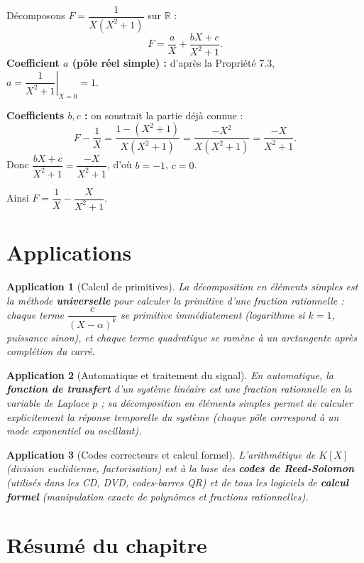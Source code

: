 \documentclass[a4paper,12pt,openany]{book}
\newtheorem{application}{Application}[section]
\begin{document}
\begin{exemple}[7.8]
Décomposons $F=\dfrac{1}{X(X^2+1)}$ sur $\mathbb{R}$ :
\[
F = \frac{a}{X} + \frac{bX+c}{X^2+1}.
\]
\textbf{Coefficient $a$ (pôle réel simple) :} d'après la Propriété 7.3,
$a = \left.\dfrac{1}{X^2+1}\right|_{X=0} = 1$.

\textbf{Coefficients $b,c$ :} on soustrait la partie déjà connue :
\[
F - \frac{1}{X} = \frac{1-(X^2+1)}{X(X^2+1)} = \frac{-X^2}{X(X^2+1)} =
\frac{-X}{X^2+1}.
\]
Donc $\dfrac{bX+c}{X^2+1} = \dfrac{-X}{X^2+1}$, d'où $b=-1$, $c=0$.

Ainsi $F = \dfrac1X - \dfrac{X}{X^2+1}$.
\end{exemple}

\section{Applications}

\begin{application}[Calcul de primitives]
La décomposition en éléments simples est la méthode \textbf{universelle}
pour calculer la primitive d'une fraction rationnelle : chaque terme
$\dfrac{c}{(X-\alpha)^k}$ se primitive immédiatement (logarithme si
$k=1$, puissance sinon), et chaque terme quadratique se ramène à un
arctangente après complétion du carré.
\end{application}

\begin{application}[Automatique et traitement du signal]
En automatique, la \textbf{fonction de transfert} d'un système linéaire
est une fraction rationnelle en la variable de Laplace $p$ ; sa
décomposition en éléments simples permet de calculer explicitement la
réponse temporelle du système (chaque pôle correspond à un mode
exponentiel ou oscillant).
\end{application}

\begin{application}[Codes correcteurs et calcul formel]
L'arithmétique de $K[X]$ (division euclidienne, factorisation) est à la
base des \textbf{codes de Reed-Solomon} (utilisés dans les CD, DVD,
codes-barres QR) et de tous les logiciels de \textbf{calcul formel}
(manipulation exacte de polynômes et fractions rationnelles).
\end{application}

\section{Résumé du chapitre}
\end{document}
